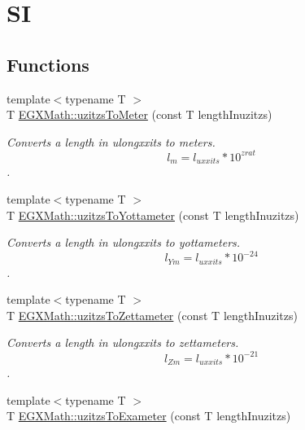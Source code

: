 \hypertarget{group___e_g_x_math-_conversions-_length_conversions-_non-_s_i-uzitzs-_s_i}{}\section{SI}
\label{group___e_g_x_math-_conversions-_length_conversions-_non-_s_i-uzitzs-_s_i}
\subsection*{Functions}
\begin{DoxyCompactItemize}
\item 
{\footnotesize template$<$typename T $>$ }\\T \mbox{\hyperlink{group___e_g_x_math-_conversions-_length_conversions-_non-_s_i-uzitzs-_s_i_gad256d80aa1424b503ded3fda023ee4dd}{E\+G\+X\+Math\+::uzitzs\+To\+Meter}} (const T length\+Inuzitzs)
\begin{DoxyCompactList}\small\item\em Converts a length in ulongxxits to meters. \[ l_{m}=l_{uxxits} * 10^{zrat} \]. \end{DoxyCompactList}\item 
{\footnotesize template$<$typename T $>$ }\\T \mbox{\hyperlink{group___e_g_x_math-_conversions-_length_conversions-_non-_s_i-uzitzs-_s_i_gac20be4db1eed0397d7925d5b7148dd94}{E\+G\+X\+Math\+::uzitzs\+To\+Yottameter}} (const T length\+Inuzitzs)
\begin{DoxyCompactList}\small\item\em Converts a length in ulongxxits to yottameters. \[ l_{Ym}=l_{uxxits} * 10^{-24} \]. \end{DoxyCompactList}\item 
{\footnotesize template$<$typename T $>$ }\\T \mbox{\hyperlink{group___e_g_x_math-_conversions-_length_conversions-_non-_s_i-uzitzs-_s_i_ga43f793911855da08c6649eb9b059d9c2}{E\+G\+X\+Math\+::uzitzs\+To\+Zettameter}} (const T length\+Inuzitzs)
\begin{DoxyCompactList}\small\item\em Converts a length in ulongxxits to zettameters. \[ l_{Zm}=l_{uxxits} * 10^{-21} \]. \end{DoxyCompactList}\item 
{\footnotesize template$<$typename T $>$ }\\T \mbox{\hyperlink{group___e_g_x_math-_conversions-_length_conversions-_non-_s_i-uzitzs-_s_i_ga4c102f14f5804c46db22137411ceb3be}{E\+G\+X\+Math\+::uzitzs\+To\+Exameter}} (const T length\+Inuzitzs)

\end{DoxyCompactItemize}
